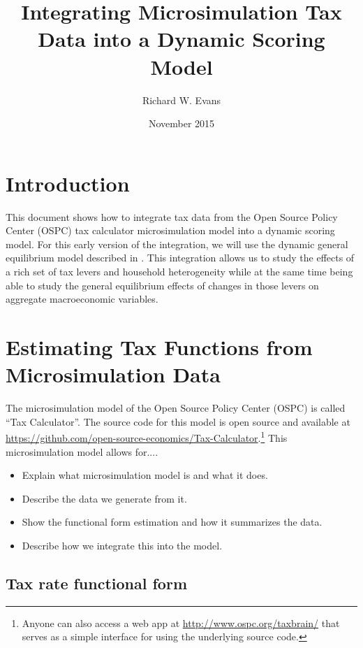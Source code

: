 \documentclass[letterpaper,12pt]{article}
\theoremstyle{definition}
\begin{document}
\title{Integrating Microsimulation Tax Data into a Dynamic Scoring Model}
\author{Richard W. Evans}
\date{November 2015}
\maketitle


\section{Introduction}\label{SecIntro}

  This document shows how to integrate tax data from the Open Source Policy Center (OSPC) tax calculator microsimulation model into a dynamic scoring model. For this early version of the integration, we will use the dynamic general equilibrium model described in \citet{DeBackerEtAl2015}. This integration allows us to study the effects of a rich set of tax levers and household heterogeneity while at the same time being able to study the general equilibrium effects of changes in those levers on aggregate macroeconomic variables.


\section{Estimating Tax Functions from Microsimulation Data}\label{SecMicroTaxFunc}

  The microsimulation model of the Open Source Policy Center (OSPC) is called ``Tax Calculator''. The source code for this model is open source and available at \href{https://github.com/open-source-economics/Tax-Calculator}{https://github.com/open-source-economics/Tax-Calculator}.\footnote{Anyone can also access a web app at \href{http://www.ospc.org/taxbrain/}{http://www.ospc.org/taxbrain/} that serves as a simple interface for using the underlying source code.} This microsimulation model allows for....

  \begin{itemize}
    \item Explain what microsimulation model is and what it does.
    \item Describe the data we generate from it.
    \item Show the functional form estimation and how it summarizes the data.
    \item Describe how we integrate this into the model.
  \end{itemize}


  \subsection{Tax rate functional form}\label{SecFuncForm}
\end{document}
